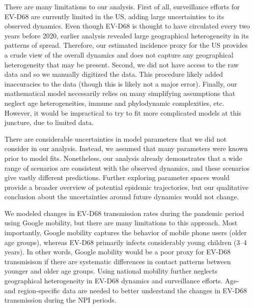 \documentclass[12pt]{article}
\begin{document}
There are many limitations to our analysis.
First of all, surveillance efforts for EV-D68 are currently limited in the US, adding large uncertainties to its observed dynamics.
Even though EV-D68 is thought to have circulated every two years before 2020, earlier analysis revealed large geographical heterogeneity in its patterns of spread.
Therefore, our estimated incidence proxy for the US provides a crude view of the overall dynamics and does not capture any geographical heterogeneity that may be present.
Second, we did not have access to the raw data and so we manually digitized the data.
This procedure likely added inaccuracies to the data (though this is likely not a major error).
Finally, our mathematical model necessarily relies on many simplifying assumptions that neglect age heterogeneities, immune and phylodynamic complexities, etc.
However, it would be impractical to try to fit more complicated models at this juncture, due to limited data.

There are considerable uncertainties in model parameters that we did not consider in our analysis.
Instead, we assumed that many parameters were known prior to model fits.
Nonetheless, our analysis already demonstrates that a wide range of scenarios are consistent with the observed dynamics, and
these scenarios give vastly different predictions.
Further exploring parameter spaces would provide a broader overview of potential epidemic trajectories, but our qualitative conclusion about the uncertainties around future dynamics would not change.

We modeled changes in EV-D68 transmission rates during the pandemic period using Google mobility, but there are many limitations to this approach.
Most importantly, Google mobility captures the behavior of mobile phone users (older age groups), whereas EV-D68 primarily infects considerably young children (3--4 years).
In other words, Google mobility would be a poor proxy for EV-D68 transmisison if there are systematic differences in contact patterns between younger and older age groups.
Using national mobility further neglects geographical heterogeneity in EV-D68 dynamics and surveillance efforts.
Age- and region-specific data are needed to better understand the changes in EV-D68 transmission during the NPI periods.
\end{document}
